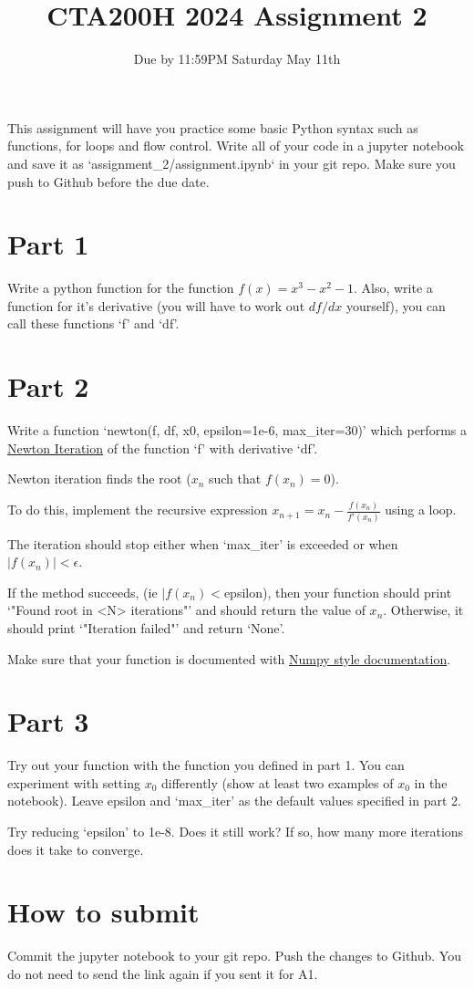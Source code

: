 \documentclass{article}
\title{CTA200H 2024 Assignment 2}
\author{Due by 11:59PM Saturday May 11th}
\date{}
\begin{document}
\maketitle

This assignment will have you practice some basic Python syntax such as functions, for loops and flow control. Write all of your code in a jupyter notebook and save it as `assignment\_2/assignment.ipynb` in your git repo. Make sure you push to Github before the due date.

\section*{Part 1}

Write a python function for the function $f(x) = x^3 - x^2 - 1$. Also, write a function for it's derivative (you will have to work out $df/dx$ yourself), you can call these functions `f' and `df'.

\section*{Part 2}

Write a function `newton(f, df, x0, epsilon=1e-6, max\_iter=30)' which performs a \href{https://en.wikipedia.org/wiki/Newton%27s_method}{Newton Iteration} of the function `f' with derivative `df'.

Newton iteration finds the root ($x_n$ such that $f(x_n) = 0$).

To do this, implement the recursive expression $x_{n+1} = x_n - \frac{f(x_n)}{f'(x_n)}$ using a loop.

The iteration should stop either when `max\_iter' is exceeded or when $|f(x_n)| < \epsilon$.

If the method succeeds, (ie $|f(x_n) < $epsilon), then your function should print `"Found root in <N> iterations"' and should return the value of $x_n$. Otherwise, it should print `"Iteration failed"' and return `None'.

Make sure that your function is documented with \href{https://numpydoc.readthedocs.io/en/latest/format.html}{Numpy style documentation}.

\section*{Part 3}

Try out your function with the function you defined in part 1. You can experiment with setting $x_0$ differently (show at least two examples of $x_0$ in the notebook). Leave epsilon and `max\_iter' as the default values specified in part 2.

Try reducing `epsilon' to 1e-8. Does it still work? If so, how many more iterations does it take to converge.

\section*{How to submit}

Commit the jupyter notebook to your git repo. Push the changes to Github. You do not need to send the link again if you sent it for A1.
\end{document}
